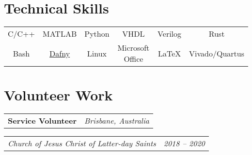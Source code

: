 \documentclass[letterpaper,12pt]{article}
\makeatletter
\def\fakesc#1{%
  \begingroup%
  \xdef\fake@name{\csname\curr@fontshape/\f@size\endcsname}%
  \fontsize{\fontdimen8\fake@name}{\baselineskip}\selectfont%
  \uppercase{#1}%
  \endgroup%
}
\newcommand{\simpleHeading}[2]{
    \vspace{-1pt}
    \begin{tabular*}{0.99\textwidth}[t]{l@{\extracolsep{\fill}}r}
        #1 & #2 \\
    \end{tabular*}
}
\newcommand{\positionHeading}[4]{
    \simpleHeading{\textbf{#1}}{\textit{#2}}
    \simpleHeading{\textit{#3}}{\textit{#4}}
}
\newcommand{\simpleParagraph}[1]{
    \vspace{-1pt}
    \begin{adjustwidth}{7pt}{0pt}
        #1
    \end{adjustwidth}
}
\newcommand{\matlab}[0]{
    MATLAB
}
\makeatother
\begin{document}


    



\section{Technical Skills}
  \begin{adjustwidth}{0.15in}{0.0in}
    \begin{tabular*}{0.97\linewidth}{@{\extracolsep{\fill}} cccccc }
        C/C++
            & \matlab
            & Python & VHDL & Verilog & Rust
            \vspace{5pt} \\
       
        Bash
            & \href{https://dafny.org/}{Dafny}
            & Linux & Microsoft Office & \LaTeX & Vivado/Quartus
    \end{tabular*}
  \end{adjustwidth}


\section{Volunteer Work}
    \positionHeading{Service Volunteer}{Brisbane, Australia}
        {Church of Jesus Christ of Latter-day Saints}{2018 -- 2020}




\end{document}
